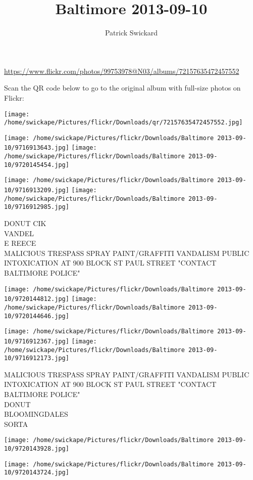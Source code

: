 \documentclass[10pt,letterpaper]{article}
\title{Baltimore 2013-09-10}
\author{Patrick Swickard}
\date{}
\begin{document}
\maketitle

\url{https://www.flickr.com/photos/99753978@N03/albums/72157635472457552}

Scan the QR code below to go to the original album with full-size photos on Flickr:

\texttt{[image: /home/swickape/Pictures/flickr/Downloads/qr/72157635472457552.jpg]}
\pagebreak

\texttt{[image: /home/swickape/Pictures/flickr/Downloads/Baltimore 2013-09-10/9716913643.jpg]}
\texttt{[image: /home/swickape/Pictures/flickr/Downloads/Baltimore 2013-09-10/9720145454.jpg]}

\texttt{[image: /home/swickape/Pictures/flickr/Downloads/Baltimore 2013-09-10/9716913209.jpg]}
\texttt{[image: /home/swickape/Pictures/flickr/Downloads/Baltimore 2013-09-10/9716912985.jpg]}

DONUT CIK\\
VANDEL\\
E REECE\\
MALICIOUS TRESPASS SPRAY PAINT/GRAFFITI VANDALISM PUBLIC INTOXICATION AT 900 BLOCK ST PAUL STREET "CONTACT BALTIMORE POLICE"
\pagebreak

\texttt{[image: /home/swickape/Pictures/flickr/Downloads/Baltimore 2013-09-10/9720144812.jpg]}
\texttt{[image: /home/swickape/Pictures/flickr/Downloads/Baltimore 2013-09-10/9720144646.jpg]}

\texttt{[image: /home/swickape/Pictures/flickr/Downloads/Baltimore 2013-09-10/9716912367.jpg]}
\texttt{[image: /home/swickape/Pictures/flickr/Downloads/Baltimore 2013-09-10/9716912173.jpg]}

MALICIOUS TRESPASS SPRAY PAINT/GRAFFITI VANDALISM PUBLIC INTOXICATION AT 900 BLOCK ST PAUL STREET "CONTACT BALTIMORE POLICE"\\
DONUT\\
BLOOMINGDALES\\
SORTA
\pagebreak

\texttt{[image: /home/swickape/Pictures/flickr/Downloads/Baltimore 2013-09-10/9720143928.jpg]}

\vspace{0.25in}
\texttt{[image: /home/swickape/Pictures/flickr/Downloads/Baltimore 2013-09-10/9720143724.jpg]}
\end{document}
